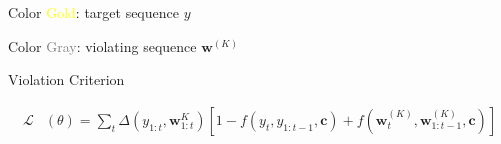 \documentclass{beamer}
\let\tempone\itemize
\let\temptwo\enditemize
\renewenvironment{itemize}{\tempone\addtolength{\itemsep}{0.5\baselineskip}}{\temptwo}
\newcommand{\air}{\vspace{0.25cm}}
\newcommand{\wvec}{\mathbf{w}}
\newcommand{\cvec}{\mathbf{c}}
\begin{document}
\begin{frame}[fragile]
\begin{center}
\begin{tikzpicture}[transform canvas = {scale=0.8}]
\end{tikzpicture}
  \end{center}  

  \air 
  \air 

  \begin{itemize}
  \item Color \textcolor{yellow}{Gold}: target sequence $y$
  \item Color \textcolor{gray}{Gray}: violating sequence $\wvec^{(K)}$
  \end{itemize}

  \air 
  \centerline{Violation Criterion}
  \vspace{-0.5cm}
\begin{align*}
 \mathcal{L}&(\theta) = \sum_{t} \Delta(y_{1:t}, \wvec_{1:t}^{K}) \left[1 - f(y_t, y_{1:t-1}, \cvec) +  f(\wvec_t^{(K)}, \wvec_{1:t-1}^{(K)}, \cvec) \right] 
\end{align*}

\end{frame}
\end{document}
